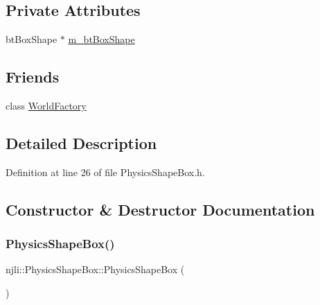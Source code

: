 \subsection*{Private Attributes}
\begin{DoxyCompactItemize}
\item 
bt\+Box\+Shape $\ast$ \mbox{\hyperlink{classnjli_1_1_physics_shape_box_a2e9169aa7d91d43890ac1e231ebd52a8}{m\+\_\+bt\+Box\+Shape}}
\end{DoxyCompactItemize}
\subsection*{Friends}
\begin{DoxyCompactItemize}
\item 
class \mbox{\hyperlink{classnjli_1_1_physics_shape_box_acb96ebb09abe8f2a37a915a842babfac}{World\+Factory}}
\end{DoxyCompactItemize}


\subsection{Detailed Description}


Definition at line 26 of file Physics\+Shape\+Box.\+h.



\subsection{Constructor \& Destructor Documentation}
\mbox{\label{classnjli_1_1_physics_shape_box_a42baebdb0053634644acf4df9ca2562c}} 
\subsubsection{\texorpdfstring{Physics\+Shape\+Box()}{PhysicsShapeBox()}\hspace{0.1cm}{\footnotesize\ttfamily [1/3]}}
{\footnotesize\ttfamily njli\+::\+Physics\+Shape\+Box\+::\+Physics\+Shape\+Box (\begin{DoxyParamCaption}{ }\end{DoxyParamCaption})\hspace{0.3cm}{\ttfamily [protected]}}

